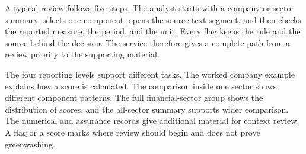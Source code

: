 A typical review follows five steps. The analyst starts with a company or sector summary, selects one component, opens the source text segment, and then checks the reported measure, the period, and the unit. Every flag keeps the rule and the source behind the decision. The service therefore gives a complete path from a review priority to the supporting material.

The four reporting levels support different tasks. The worked company example explains how a score is calculated. The comparison inside one sector shows different component patterns. The full financial-sector group shows the distribution of scores, and the all-sector summary supports wider comparison. The numerical and assurance records give additional material for context review. A flag or a score marks where review should begin and does not prove greenwashing.

\FloatBarrier
